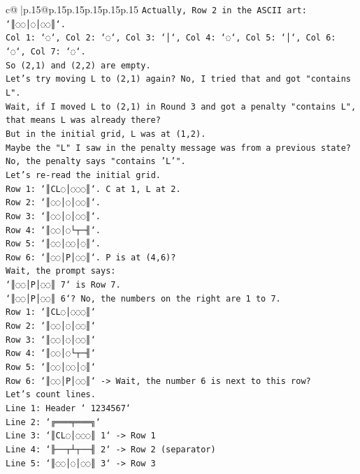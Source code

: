 \documentclass{article}
\begin{document}
{\begin{supertabular}{c@{$\;$}|p{.15\linewidth}@{}p{.15\linewidth}p{.15\linewidth}p{.15\linewidth}p{.15\linewidth}p{.15\linewidth}}
{{{\texttt{Actually, Row 2 in the ASCII art: `║◌◌│◌│◌◌║`.} \\
\texttt{Col 1: `◌`, Col 2: `◌`, Col 3: `│`, Col 4: `◌`, Col 5: `│`, Col 6: `◌`, Col 7: `◌`.} \\
\texttt{So (2,1) and (2,2) are empty.} \\
\texttt{Let's try moving L to (2,1) again? No, I tried that and got "contains L".} \\
\texttt{Wait, if I moved L to (2,1) in Round 3 and got a penalty "contains L", that means L was already there?} \\
\texttt{But in the initial grid, L was at (1,2).} \\
\texttt{Maybe the "L" I saw in the penalty message was from a previous state?} \\
\texttt{No, the penalty says "contains 'L'".} \\
\texttt{Let's re{-}read the initial grid.} \\
\texttt{Row 1: `║CL◌│◌◌◌║`. C at 1, L at 2.} \\
\texttt{Row 2: `║◌◌│◌│◌◌║`.} \\
\texttt{Row 3: `║◌◌│◌│◌◌║`.} \\
\texttt{Row 4: `║◌◌│◌└┬─╢`.} \\
\texttt{Row 5: `║◌◌│◌◌│◌║`.} \\
\texttt{Row 6: `║◌◌│P│◌◌║`. P is at (4,6)?} \\
\texttt{Wait, the prompt says:} \\
\texttt{`║◌◌│P│◌◌║ 7` is Row 7.} \\
\texttt{`║◌◌│P│◌◌║ 6`? No, the numbers on the right are 1 to 7.} \\
\texttt{Row 1: `║CL◌│◌◌◌║`} \\
\texttt{Row 2: `║◌◌│◌│◌◌║`} \\
\texttt{Row 3: `║◌◌│◌│◌◌║`} \\
\texttt{Row 4: `║◌◌│◌└┬─╢`} \\
\texttt{Row 5: `║◌◌│◌◌│◌║`} \\
\texttt{Row 6: `║◌◌│P│◌◌║` {-}> Wait, the number 6 is next to this row?} \\
\texttt{Let's count lines.} \\
\texttt{Line 1: Header ` 1234567`} \\
\texttt{Line 2: `╔═══╤═══╗`} \\
\texttt{Line 3: `║CL◌│◌◌◌║ 1` {-}> Row 1} \\
\texttt{Line 4: `╟──┬┴┬──╢ 2` {-}> Row 2 (separator)} \\
\texttt{Line 5: `║◌◌│◌│◌◌║ 3` {-}> Row 3} \\
}}}
\end{supertabular}}
\end{document}
